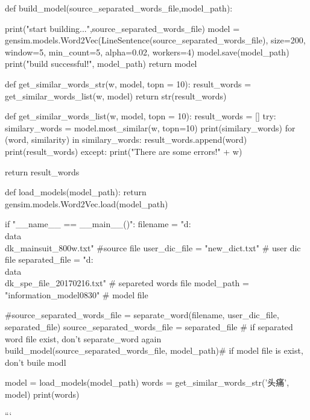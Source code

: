def build_model(source_separated_words_file,model_path):

    print("start building...",source_separated_words_file)
    model = gensim.models.Word2Vec(LineSentence(source_separated_words_file), size=200, window=5, min_count=5, alpha=0.02, workers=4)       
    model.save(model_path)
    print("build successful!", model_path)
    return model

def get_similar_words_str(w, model, topn = 10):
    result_words = get_similar_words_list(w, model)    
    return str(result_words)


def get_similar_words_list(w, model, topn = 10):
    result_words = []
    try:
        similary_words = model.most_similar(w, topn=10)
        print(similary_words)
        for (word, similarity) in similary_words:
            result_words.append(word)
        print(result_words)
    except:
        print("There are some errors!" + w)
        
    return result_words

def load_models(model_path):
    return gensim.models.Word2Vec.load(model_path)

if "__name__ == __main__()":
    filename = "d:\\data\\dk_mainsuit_800w.txt" #source file
    user_dic_file = "new_dict.txt" # user dic file
    separated_file = "d:\\data\\dk_spe_file_20170216.txt" # separeted words file
    model_path = "information_model0830" # model file
    
    #source_separated_words_file = separate_word(filename, user_dic_file, separated_file)
    source_separated_words_file = separated_file    # if separated word file exist, don't separate_word again
    build_model(source_separated_words_file, model_path)# if model file is exist, don't buile modl 

    model = load_models(model_path)
    words = get_similar_words_str('头痛', model)
    print(words)

```